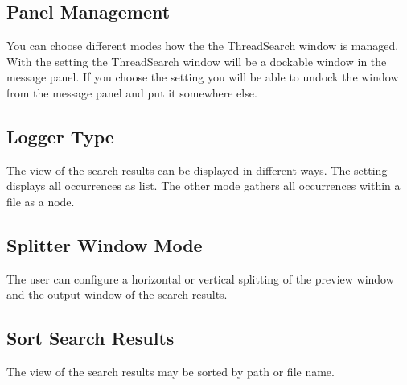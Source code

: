 \subsection{Panel Management}

You can choose different modes how the the ThreadSearch window is managed. With the setting  the ThreadSearch window will be a dockable window in the message panel. If you choose the setting  you will be able to undock the window from the message panel and put it somewhere else.

\subsection{Logger Type}

The view of the search results can be displayed in different ways. The setting  displays all occurrences as list. The other mode  gathers all occurrences within a file as a node.

\subsection{Splitter Window Mode}

The user can configure a horizontal or vertical splitting of the preview window and the output window of the search results.

\subsection{Sort Search Results}

The view of the search results may be sorted by path or file name.
